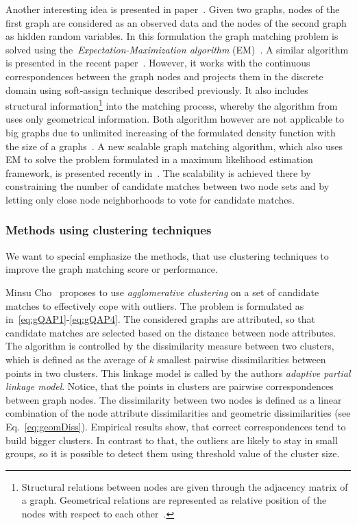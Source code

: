 Another interesting idea is presented in paper~\cite{Hancock_EM_SVD}. Given two graphs, nodes of the first graph are considered as an observed data and the nodes of the second graph as hidden random variables. In this formulation the graph matching problem is solved using the~\emph{Expectation-Maximization algorithm} (EM)~\cite{EM_Dempster1977}. A similar algorithm is presented in the recent paper~\cite{Sanrom2012}. However, it works with the continuous correspondences between the graph nodes and projects them in the discrete domain using soft-assign technique described previously. It also includes structural information\footnote{Structural relations between nodes are given through the adjacency matrix of a graph. Geometrical relations are represented as relative position of the nodes with respect to each other~\cite{Sanrom2012}.} into the matching process, whereby the algorithm from~\cite{Hancock_EM_SVD} uses only geometrical information. Both algorithm however are not applicable to big graphs due to unlimited increasing of the formulated density function with the size of a graphs~\cite{Armiti2014}. A new scalable graph matching algorithm, which also uses EM to solve the problem formulated in a maximum likelihood estimation framework, is presented recently in~\cite{Armiti2014}. The scalability is achieved there by constraining the number of candidate matches between two node sets and by letting only close node neighborhoods to vote for candidate matches.
\subsubsection{Methods using clustering techniques}
We want to special emphasize the methods, that use clustering techniques to improve the graph matching score or performance.

Minsu Cho~\cite{Cho2009_AgglClustering} proposes to use \emph{agglomerative clustering} on a set of candidate matches to effectively cope with outliers. The problem is formulated as in~\eqref{eq:gQAP1}-\eqref{eq:gQAP4}. The considered graphs are attributed, so that candidate matches are selected based on the distance between node attributes. The algorithm is controlled by the dissimilarity measure between two clusters, which is defined as the average of $k$ smallest pairwise dissimilarities between points in two clusters. This linkage model is called by the authors \emph{adaptive partial linkage model}. Notice, that the points in clusters are pairwise correspondences between graph nodes. The dissimilarity between two nodes is defined as a linear combination of the node attribute dissimilarities and 
geometric dissimilarities (see Eq.~\eqref{eq:geomDiss}). Empirical results show, that correct correspondences tend to build bigger clusters. In contrast to that, the outliers are likely to stay in small groups, so it is possible to detect them using threshold value of the cluster size.


